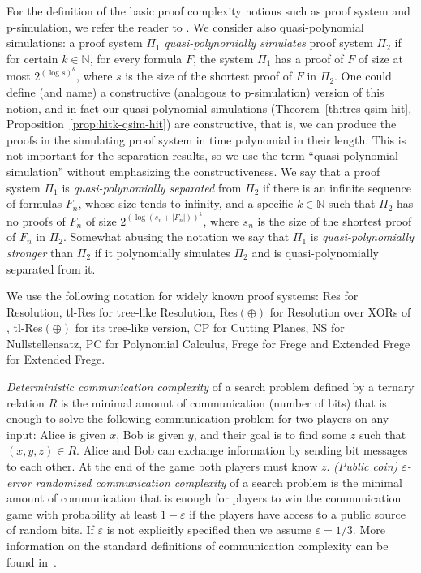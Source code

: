 \documentclass[11pt]{article}
\newcommand{\scterm}[1]{{\textrm{\sc #1}}}
\newcommand{\tres}{\scterm{tl-Res}}
\newcommand{\res}{\scterm{Res}}
\newcommand{\resp}{{\res}$(\oplus)$}
\newcommand{\tresp}{{\tres}$(\oplus)$}
\newcommand{\F}{\scterm{Frege}}
\newcommand{\EF}{\scterm{Extended {\F}}}
\newcommand{\cp}{\scterm{CP}}
\newcommand{\pc}{\scterm{PC}}
\newcommand{\ns}{\scterm{NS}}
\newcommand{\TODOJ}[1]{}%
\numberwithin{equation}{section}
\begin{document}
\TODOJ{New paragraph below --- please check.}
For the definition of the basic proof complexity notions such as proof system and p-simulation, 
we refer the reader to \cite{CR79}. We consider also quasi-polynomial simulations:
a proof system $\Pi_1$ \emph{quasi-polynomially simulates} proof system $\Pi_2$
if for certain $k\in\mathbb{N}$,
for every formula $F$, the system $\Pi_1$ has a proof of $F$ of size at most $2^{(\log s)^k}$,
where $s$ is the size of the shortest proof of $F$ in $\Pi_2$.
One could define (and name) a constructive (analogous to p-simulation) 
version of this notion, and in fact our quasi-polynomial simulations 
(Theorem~\ref{th:tres-qsim-hit}, Proposition~\ref{prop:hitk-qsim-hit})
are constructive, that is, we can produce the proofs in the simulating proof system
in time polynomial in their length. This is not important for the separation
results, so we use the term ``quasi-polynomial simulation'' without emphasizing
the constructiveness.
We say that a proof system $\Pi_1$ is \emph{quasi-polynomially separated}
from $\Pi_2$ if there is an infinite sequence of formulas $F_n$, whose size tends to infinity, and a specific $k\in\mathbb{N}$ such that
$\Pi_2$ has no proofs of $F_n$ of size $2^{(\log (s_n+|F_n|))^k}$,
where $s_n$ is the size of the shortest proof of $F_n$ in $\Pi_2$.
Somewhat abusing the notation we say that $\Pi_1$ is \emph{quasi-polynomially stronger}
than $\Pi_2$ if it polynomially simulates $\Pi_2$ and is quasi-polynomially separated from it.

We use the following notation for widely known proof systems:
{\res} for Resolution,
{\tres} for tree-like Resolution,
{\resp} for Resolution over XORs of \cite{IS20},
{\tresp} for its tree-like version,
{\cp} for Cutting Planes,
{\ns} for Nullstellensatz,
{\pc} for Polynomial Calculus,
{\F} for Frege and {\EF} for Extended Frege.

\emph{Deterministic communication complexity} of a search problem defined by a ternary relation $R$
is the minimal amount of communication (number of bits) that is enough to solve the following 
communication problem for two players on any input: Alice is given $x$, Bob is given $y$, 
and their goal is to find some $z$ such that $(x,y,z) \in R$.
Alice and Bob can exchange information by sending bit messages to each other. 
At the end of the game both players must know $z$.
\emph{(Public coin) $\varepsilon$-error randomized communication complexity} of a search problem
is the minimal amount of communication that is enough for players to win the communication game 
with probability at least $1-\varepsilon$ if the players have access to a public source of random bits.
If $\varepsilon$ is not explicitly specified then we assume $\varepsilon = 1/3$.
More information on the standard definitions  of communication complexity can be found in~\cite{KN97}.
\end{document}
